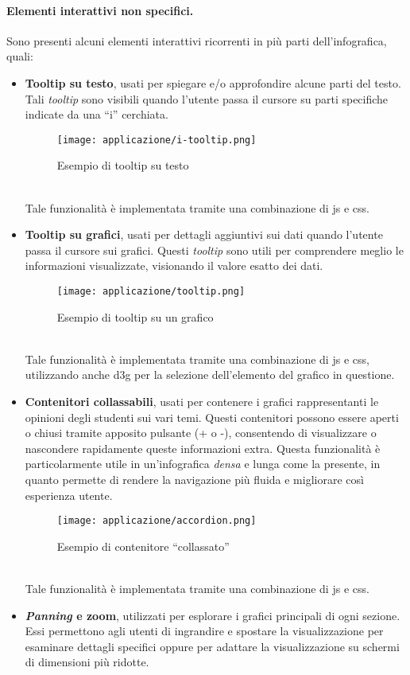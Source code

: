\paragraph{Elementi interattivi non specifici.}
Sono presenti alcuni elementi interattivi ricorrenti in più parti dell'infografica, quali:
\begin{itemize}
    \item \textbf{Tooltip su testo}, usati per spiegare e/o approfondire alcune parti del testo. Tali \emph{tooltip}
    sono visibili quando l'utente passa il cursore su parti specifiche indicate da una ``i'' cerchiata.
    \begin{figure}[h]
        \centering
        \texttt{[image: applicazione/i-tooltip.png]}
        \caption{Esempio di tooltip su testo}
        \label{fig:app_i-tooltip}
    \end{figure}
    \\Tale funzionalità è implementata tramite una combinazione di \gls{js} e \gls{css}.
    \item \textbf{Tooltip su grafici}, usati per dettagli aggiuntivi sui dati quando l'utente passa il cursore sui grafici. 
    Questi \emph{tooltip} sono utili per comprendere meglio le informazioni visualizzate, visionando il valore esatto dei dati.
    \begin{figure}[h]
        \centering
        \texttt{[image: applicazione/tooltip.png]}
        \caption{Esempio di tooltip su un grafico}
        \label{fig:app_tooltip}
    \end{figure}
    \\Tale funzionalità è implementata tramite una combinazione di \gls{js} e \gls{css}, utilizzando anche \gls{d3g} per la selezione dell'elemento del grafico in questione.
    \item \textbf{Contenitori collassabili}, usati per contenere i grafici rappresentanti le opinioni degli studenti sui vari temi. Questi contenitori 
    possono essere aperti o chiusi tramite apposito pulsante (+ o -), consentendo di visualizzare o nascondere rapidamente queste informazioni extra.
    Questa funzionalità è particolarmente utile in un'infografica \emph{densa} e lunga come la presente, in quanto permette di rendere la navigazione più fluida e 
    migliorare così esperienza utente.
    \begin{figure}[h]
        \centering
        \texttt{[image: applicazione/accordion.png]}
        \caption{Esempio di contenitore ``collassato''}
        \label{fig:app_accordion}
    \end{figure}
    \\Tale funzionalità è implementata tramite una combinazione di \gls{js} e \gls{css}.
    \item \textbf{\emph{Panning} e zoom}, utilizzati per esplorare i grafici principali di ogni sezione. Essi permettono agli utenti di ingrandire e spostare la visualizzazione 
    per esaminare dettagli specifici oppure per adattare la visualizzazione su schermi di dimensioni più ridotte. 
    

\end{itemize}
